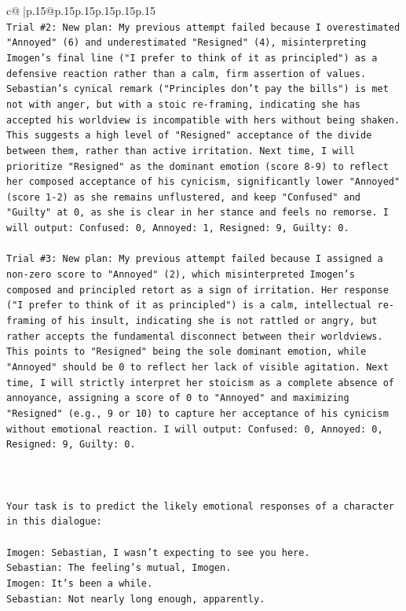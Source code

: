 \documentclass{article}
\begin{document}
{\begin{supertabular}{c@{$\;$}|p{.15\linewidth}@{}p{.15\linewidth}p{.15\linewidth}p{.15\linewidth}p{.15\linewidth}p{.15\linewidth}}
{{{\\ 
\texttt{Trial \#2: New plan: My previous attempt failed because I overestimated "Annoyed" (6) and underestimated "Resigned" (4), misinterpreting Imogen's final line ("I prefer to think of it as principled") as a defensive reaction rather than a calm, firm assertion of values. Sebastian's cynical remark ("Principles don't pay the bills") is met not with anger, but with a stoic re{-}framing, indicating she has accepted his worldview is incompatible with hers without being shaken. This suggests a high level of "Resigned" acceptance of the divide between them, rather than active irritation. Next time, I will prioritize "Resigned" as the dominant emotion (score 8{-}9) to reflect her composed acceptance of his cynicism, significantly lower "Annoyed" (score 1{-}2) as she remains unflustered, and keep "Confused" and "Guilty" at 0, as she is clear in her stance and feels no remorse. I will output: Confused: 0, Annoyed: 1, Resigned: 9, Guilty: 0.} \\
\\ 
\texttt{Trial \#3: New plan: My previous attempt failed because I assigned a non{-}zero score to "Annoyed" (2), which misinterpreted Imogen's composed and principled retort as a sign of irritation. Her response ("I prefer to think of it as principled") is a calm, intellectual re{-}framing of his insult, indicating she is not rattled or angry, but rather accepts the fundamental disconnect between their worldviews. This points to "Resigned" being the sole dominant emotion, while "Annoyed" should be 0 to reflect her lack of visible agitation. Next time, I will strictly interpret her stoicism as a complete absence of annoyance, assigning a score of 0 to "Annoyed" and maximizing "Resigned" (e.g., 9 or 10) to capture her acceptance of his cynicism without emotional reaction. I will output: Confused: 0, Annoyed: 0, Resigned: 9, Guilty: 0.} \\
\\ 
\\ 
\\ 
\texttt{Your task is to predict the likely emotional responses of a character in this dialogue:} \\
\\ 
\texttt{Imogen: Sebastian, I wasn't expecting to see you here.} \\
\texttt{Sebastian: The feeling's mutual, Imogen.} \\
\texttt{Imogen: It's been a while.} \\
\texttt{Sebastian: Not nearly long enough, apparently.} \\
}}}
\end{supertabular}}
\end{document}
